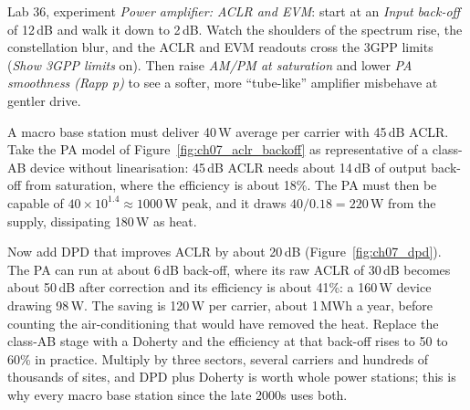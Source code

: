 

\begin{tryit}
Lab 36, experiment \emph{Power amplifier: ACLR and EVM}: start at an \emph{Input back-off} of 12\,dB
and walk it down to 2\,dB. Watch the shoulders of the spectrum rise, the constellation blur, and the
ACLR and EVM readouts cross the 3GPP limits (\emph{Show 3GPP limits} on). Then raise \emph{AM/PM at
saturation} and lower \emph{PA smoothness (Rapp p)} to see a softer, more ``tube-like'' amplifier
misbehave at gentler drive.
\end{tryit}

\begin{worked}
A macro base station must deliver 40\,W average per carrier with 45\,dB ACLR. Take the PA model of
Figure~\ref{fig:ch07_aclr_backoff} as representative of a class-AB device without linearisation: 45\,dB
ACLR needs about 14\,dB of output back-off from saturation, where the efficiency is about 18\%. The PA
must then be capable of $40\times10^{1.4}\approx1000$\,W peak, and it draws $40/0.18=220$\,W from the
supply, dissipating 180\,W as heat.

Now add DPD that improves ACLR by about 20\,dB (Figure~\ref{fig:ch07_dpd}). The PA can run at about 6\,dB
back-off, where its raw ACLR of 30\,dB becomes about 50\,dB after correction and its efficiency is about
41\%: a 160\,W device drawing 98\,W. The saving is 120\,W per carrier, about 1\,MWh a year, before counting
the air-conditioning that would have removed the heat. Replace the class-AB stage with a Doherty and the
efficiency at that back-off rises to 50 to 60\% in practice. Multiply by three sectors, several carriers
and hundreds of thousands of sites, and DPD plus Doherty is worth whole power stations; this is why every
macro base station since the late 2000s uses both.
\end{worked}

